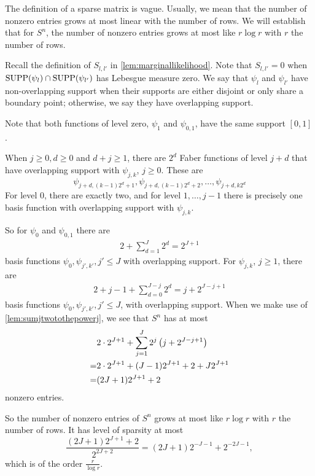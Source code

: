 \documentclass[12pt]{article}
\begin{document}
The definition of a sparse matrix is vague. Usually, we mean that the number of nonzero entries grows at most linear with the number of rows. We will establish that for $S^n$, the number of nonzero entries grows at most like $r\log r$ with $r$ the number of rows. 

Recall the definition of $S_{l,l'}$ in \cref{lem:marginallikelihood}.
Note that $S_{l,l'}=0$  when $\operatorname{SUPP}(\psi_l)\cap\operatorname{SUPP}(\psi_{l'})$ has Lebesgue measure zero. We say that $\psi_l$ and $\psi_{l'}$ have non-overlapping support when their supports are either disjoint or only share a boundary point; otherwise, we say they have overlapping support. 


Note that both functions of level zero,  \(\psi_1\) and \(\psi_{0,1}\), have the same support $[0,1]$. 

When $j\ge 0, d\ge 0$ and $d+j\ge 1$, there are \(2^d\) Faber functions of level \(j+d\) that have overlapping support with \(\psi_{j,k}\), \(j\ge 0\). These are 
\[
\psi_{j+d,(k-1)2^d+1},\psi_{j+d,(k-1)2^d+2},\ldots,\psi_{j+d,k2^d}
\]
For level 0, there are exactly two, and for level $1,\ldots,j-1$ there is precisely one basis function with overlapping support with $\psi_{j,k}$. 

So for $\psi_0$ and $\psi_{0,1}$ there are \begin{align*}
    2 + \sum_{d=1}^J 2^d = 2^{J+1} 
\end{align*}
basis functions $\psi_0,\psi_{j',k'}, j'\le J$ with overlapping support. 
For $\psi_{j,k}$, $j\ge 1$,  there are \begin{align*}
    2+ j-1 + \sum_{d=0}^{J-j} 2^d = %
    j+2^{J-j+1}
\end{align*}
basis functions $\psi_0,\psi_{j',k'}, j'\le J$, with overlapping support. When we make use of \cref{lem:sumjtwotothepowerj}, we see that $S^n$ has at most \begin{align*}
   &2\cdot 2^{J+1}+\sum_{ j=1}^J 2^j\left(j+2^{J-j+1}\right)\\
= & 2\cdot 2^{J+1}+ (J-1)2^{J+1} + 2 + J2^{J+1}  \\
= & (2J+1)2^{J+1}+2
\end{align*}
nonzero entries. 

So the number of nonzero entries of $S^n$ grows at most like $r\log r$ with $r$ the number of rows. It has level of sparsity at most
\[
\frac{(2J+1)2^{J+1}+2
}{2^{2J+2}}= (2J+1)2^{-J-1}+2^{-2J-1},
\]
which is of the order $\frac r {\log r}$. 
\appendix
\end{document}
